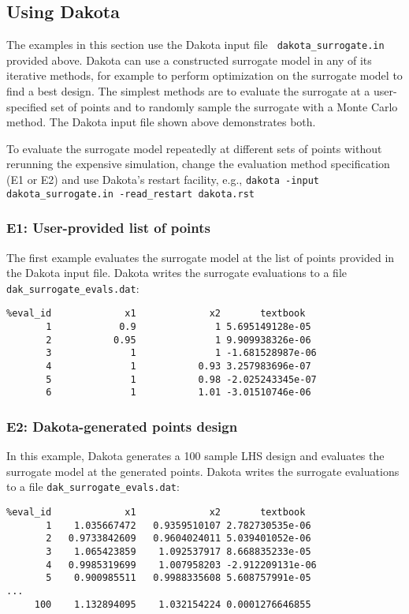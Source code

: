 \documentclass{article}
\begin{document}
\subsection{Using Dakota}

The examples in this section use the Dakota input file {\tt
  dakota\_surrogate.in} provided above.  Dakota can use a constructed
surrogate model in any of its iterative methods, for example to
perform optimization on the surrogate model to find a best design.
The simplest methods are to evaluate the surrogate at a user-specified
set of points and to randomly sample the surrogate with a Monte Carlo
method.  The Dakota input file shown above demonstrates both.

To evaluate the surrogate model repeatedly at different sets of points
without rerunning the expensive simulation, change the evaluation
method specification (E1 or E2) and use Dakota's restart facility,
e.g., {\tt dakota -input dakota\_surrogate.in -read\_restart
  dakota.rst}

\subsubsection*{E1: User-provided list of points}

The first example evaluates the surrogate model at the list of points
provided in the Dakota input file.  Dakota writes the surrogate
evaluations to a file {\tt dak\_surrogate\_evals.dat}:\\
\begin{bigbox}
\begin{verbatim}
%eval_id             x1             x2       textbook 
       1            0.9              1 5.695149128e-05 
       2           0.95              1 9.909938326e-06 
       3              1              1 -1.681528987e-06 
       4              1           0.93 3.257983696e-07 
       5              1           0.98 -2.025243345e-07 
       6              1           1.01 -3.01510746e-06 
\end{verbatim}
\end{bigbox}

\subsubsection*{E2: Dakota-generated points design}

In this example, Dakota generates a 100 sample LHS design and evaluates
the surrogate model at the generated points.  Dakota writes the
surrogate evaluations to a file {\tt dak\_surrogate\_evals.dat}:\\
\begin{bigbox}
\begin{verbatim}
%eval_id             x1             x2       textbook 
       1    1.035667472   0.9359510107 2.782730535e-06 
       2   0.9733842609   0.9604024011 5.039401052e-06 
       3    1.065423859    1.092537917 8.668835233e-05 
       4   0.9985319699    1.007958203 -2.912209131e-06 
       5    0.900985511   0.9988335608 5.608757991e-05 
...
     100    1.132894095    1.032154224 0.0001276646855 
\end{verbatim}
\end{bigbox}
\end{document}
